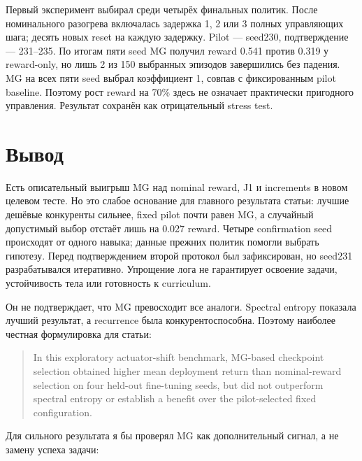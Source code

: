 \documentclass[10pt,a4paper]{article}
\begin{document}
Первый эксперимент выбирал среди четырёх финальных политик. После номинального разогрева включалась задержка 1, 2 или 3 полных управляющих шага; десять новых reset на каждую задержку. Pilot --- seed230, подтверждение --- 231--235. По итогам пяти seed MG получил reward 0.541 против 0.319 у reward-only, но лишь 2 из 150 выбранных эпизодов завершились без падения. MG на всех пяти seed выбрал коэффициент 1, совпав с фиксированным pilot baseline. Поэтому рост reward на 70\% здесь не означает практически пригодного управления. Результат сохранён как отрицательный stress test.

\section*{Вывод}

Есть описательный выигрыш MG над nominal reward, J1 и increments в новом целевом тесте. Но это слабое основание для главного результата статьи: лучшие дешёвые конкуренты сильнее, fixed pilot почти равен MG, а случайный допустимый выбор отстаёт лишь на 0.027 reward. Четыре confirmation seed происходят от одного навыка; данные прежних политик помогли выбрать гипотезу. Перед подтверждением второй протокол был зафиксирован, но seed231 разрабатывался итеративно. Упрощение лога не гарантирует освоение задачи, устойчивость тела или готовность к curriculum.

Он не подтверждает, что MG превосходит все аналоги. Spectral entropy показала лучший результат, а recurrence была конкурентоспособна. Поэтому наиболее честная формулировка для статьи:

\begin{quote}In this exploratory actuator-shift benchmark, MG-based checkpoint selection obtained higher mean deployment return than nominal-reward selection on four held-out fine-tuning seeds, but did not outperform spectral entropy or establish a benefit over the pilot-selected fixed configuration.\end{quote}

Для сильного результата я бы проверял MG как дополнительный сигнал, а не замену успеха задачи:
\end{document}
